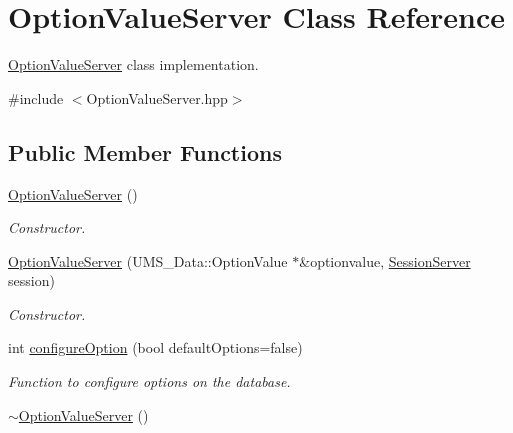 \hypertarget{classOptionValueServer}{
\section{OptionValueServer Class Reference}
\label{classOptionValueServer}
}


\hyperlink{classOptionValueServer}{OptionValueServer} class implementation.  




{\ttfamily \#include $<$OptionValueServer.hpp$>$}

\subsection*{Public Member Functions}
\begin{DoxyCompactItemize}
\item 
\hypertarget{classOptionValueServer_a8a72322eb8f598eb671f3c80265379e9}{
\hyperlink{classOptionValueServer_a8a72322eb8f598eb671f3c80265379e9}{OptionValueServer} ()}
\label{classOptionValueServer_a8a72322eb8f598eb671f3c80265379e9}

\begin{DoxyCompactList}\small\item\em Constructor. \item\end{DoxyCompactList}\item 
\hyperlink{classOptionValueServer_a2f432257cbe83451b54d59c584cc35c6}{OptionValueServer} (UMS\_\-Data::OptionValue $\ast$\&optionvalue, \hyperlink{classSessionServer}{SessionServer} session)
\begin{DoxyCompactList}\small\item\em Constructor. \item\end{DoxyCompactList}\item 
int \hyperlink{classOptionValueServer_afe5c33ad15ac74fe72690c8d54302729}{configureOption} (bool defaultOptions=false)
\begin{DoxyCompactList}\small\item\em Function to configure options on the database. \item\end{DoxyCompactList}\item 
\hypertarget{classOptionValueServer_ac302d5f497a13eabd1bbeea9c3b124d8}{
\hyperlink{classOptionValueServer_ac302d5f497a13eabd1bbeea9c3b124d8}{$\sim$OptionValueServer} ()}
\label{classOptionValueServer_ac302d5f497a13eabd1bbeea9c3b124d8}


\end{DoxyCompactItemize}
